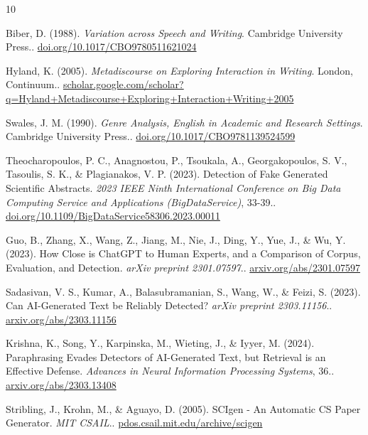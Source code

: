 \documentclass{article}
\begin{document}
\clearpage
\small
\begin{thebibliography}{10}
\raggedright

Biber, D. (1988). \textit{Variation across Speech and Writing}. Cambridge University Press.. \href{https://doi.org/10.1017/CBO9780511621024}{doi.org/10.1017/CBO9780511621024}

Hyland, K. (2005). \textit{Metadiscourse on Exploring Interaction in Writing}. London, Continuum.. \href{https://scholar.google.com/scholar?q=Hyland+Metadiscourse+Exploring+Interaction+Writing+2005}{scholar.google.com/scholar?q=Hyland+Metadiscourse+Exploring+Interaction+Writing+2005}

Swales, J. M. (1990). \textit{Genre Analysis, English in Academic and Research Settings}. Cambridge University Press.. \href{https://doi.org/10.1017/CBO9781139524599}{doi.org/10.1017/CBO9781139524599}

Theocharopoulos, P. C., Anagnostou, P., Tsoukala, A., Georgakopoulos, S. V., Tasoulis, S. K., \& Plagianakos, V. P. (2023). Detection of Fake Generated Scientific Abstracts. \textit{2023 IEEE Ninth International Conference on Big Data Computing Service and Applications (BigDataService)}, 33-39.. \href{https://doi.org/10.1109/BigDataService58306.2023.00011}{doi.org/10.1109/BigDataService58306.2023.00011}

Guo, B., Zhang, X., Wang, Z., Jiang, M., Nie, J., Ding, Y., Yue, J., \& Wu, Y. (2023). How Close is ChatGPT to Human Experts, and a Comparison of Corpus, Evaluation, and Detection. \textit{arXiv preprint 2301.07597}.. \href{https://arxiv.org/abs/2301.07597}{arxiv.org/abs/2301.07597}

Sadasivan, V. S., Kumar, A., Balasubramanian, S., Wang, W., \& Feizi, S. (2023). Can AI-Generated Text be Reliably Detected? \textit{arXiv preprint 2303.11156}.. \href{https://arxiv.org/abs/2303.11156}{arxiv.org/abs/2303.11156}

Krishna, K., Song, Y., Karpinska, M., Wieting, J., \& Iyyer, M. (2024). Paraphrasing Evades Detectors of AI-Generated Text, but Retrieval is an Effective Defense. \textit{Advances in Neural Information Processing Systems}, 36.. \href{https://arxiv.org/abs/2303.13408}{arxiv.org/abs/2303.13408}

Stribling, J., Krohn, M., \& Aguayo, D. (2005). SCIgen - An Automatic CS Paper Generator. \textit{MIT CSAIL}.. \href{https://pdos.csail.mit.edu/archive/scigen/}{pdos.csail.mit.edu/archive/scigen}


\end{thebibliography}
\end{document}

